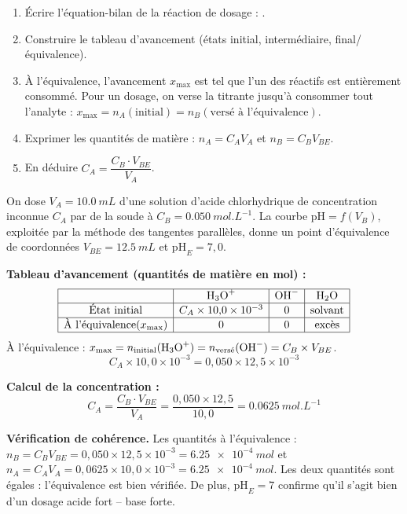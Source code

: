 \documentclass[11pt]{article}
\begin{document}
\begin{methode}
\begin{enumerate}
\item Écrire l'équation-bilan de la réaction de dosage : .
\item Construire le tableau d'avancement (états initial, intermédiaire, final/équivalence).
\item À l'équivalence, l'avancement $x_{\text{max}}$ est tel que l'un des réactifs est entièrement consommé. Pour un dosage, on verse la titrante jusqu'à consommer tout l'analyte : $x_{\text{max}} = n_A(\text{initial}) = n_B(\text{versé à l'équivalence})$.
\item Exprimer les quantités de matière : $n_A = C_A V_A$ et $n_B = C_B V_{BE}$.
\item En déduire $C_A = \dfrac{C_B \cdot V_{BE}}{V_A}$.
\end{enumerate}
\end{methode}

\begin{exemplebox}
On dose $V_A = \SI{10,0}{mL}$ d'une solution d'acide chlorhydrique de concentration inconnue $C_A$ par de la soude à $C_B = \SI{0,050}{mol.L^{-1}}$. La courbe $\mathrm{pH} = f(V_B)$, exploitée par la méthode des tangentes parallèles, donne un point d'équivalence de coordonnées $V_{BE} = \SI{12,5}{mL}$ et $\mathrm{pH}_E = 7{,}0$.

\textbf{Tableau d'avancement (quantités de matière en mol) :}
\[
\begin{array}{|c|c|c|c|}
\hline
 & \ce{H3O+} & \ce{OH-} & \ce{H2O} \\
\hline
\text{État initial} & C_A \times 10{,}0 \times 10^{-3} & 0 & \text{solvant} \\
\hline
\text{À l'équivalence} (x_{\text{max}}) & 0 & 0 & \text{excès} \\
\hline
\end{array}
\]
À l'équivalence : $x_{\text{max}} = n_{\text{initial}}(\ce{H3O+}) = n_{\text{versé}}(\ce{OH-}) = C_B \times V_{BE}$.
\[ C_A \times 10{,}0 \times 10^{-3} = 0{,}050 \times 12{,}5 \times 10^{-3} \]

\textbf{Calcul de la concentration :}
\[ C_A = \frac{C_B \cdot V_{BE}}{V_A} = \frac{0{,}050 \times 12{,}5}{10{,}0} = \SI{0,0625}{mol.L^{-1}} \]

\textbf{Vérification de cohérence.} Les quantités à l'équivalence : $n_B = C_B V_{BE} = 0{,}050 \times 12{,}5 \times 10^{-3} = \SI{6,25e-4}{mol}$ et $n_A = C_A V_A = 0{,}0625 \times 10{,}0 \times 10^{-3} = \SI{6,25e-4}{mol}$. Les deux quantités sont égales : l'équivalence est bien vérifiée. De plus, $\mathrm{pH}_E = 7$ confirme qu'il s'agit bien d'un dosage acide fort -- base forte.
\end{exemplebox}
\end{document}
